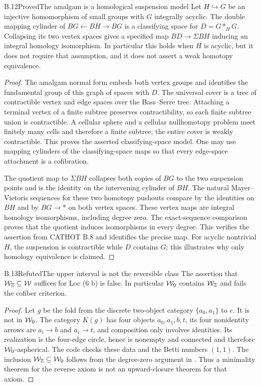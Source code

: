 \begin{claim}{B.12}{Proved}{The amalgam is a homological suspension model}
Let $H\hookrightarrow G$ be an injective homomorphism of small groups with $G$ integrally acyclic. The double mapping cylinder of $BG\leftarrow BH\to BG$ is a classifying space for $D=G*_HG$. Collapsing its two vertex spaces gives a specified map $BD\to\Sigma BH$ inducing an integral homology isomorphism. In particular this holds when $H$ is acyclic, but it does not require that assumption, and it does not assert a weak homotopy equivalence.
\end{claim}
\begin{proof}
The amalgam normal form embeds both vertex groups and identifies the fundamental group of this graph of spaces with $D$. The universal cover is a tree of contractible vertex and edge spaces over the Bass--Serre tree. Attaching a terminal vertex of a finite subtree preserves contractibility, so each finite subtree union is contractible. A cellular sphere and a cellular nullhomotopy problem meet finitely many cells and therefore a finite subtree; the entire cover is weakly contractible. This proves the asserted classifying-space model. One may use mapping cylinders of the classifying-space maps so that every edge-space attachment is a cofibration.

The quotient map to $\Sigma BH$ collapses both copies of $BG$ to the two suspension points and is the identity on the intervening cylinder of $BH$. The natural Mayer--Vietoris sequences for these two homotopy pushouts compare by the identities on $BH$ and by $BG\to *$ on both vertex spaces. These vertex maps are integral homology isomorphisms, including degree zero. The exact-sequence comparison proves that the quotient induces isomorphisms in every degree. This verifies the assertion from CATHOT B.8 and identifies the precise map. For acyclic nontrivial $H$, the suspension is contractible while $D$ contains $G$; this illustrates why only homology equivalence is claimed.
\end{proof}

\begin{claim}{B.13}{Refuted}{The upper interval is not the reversible class}
The assertion that $\mathcal{W}_{\mathbb Z}\subseteq\mathcal{W}$ suffices for Loc (6 b) is false. In particular $\mathcal{W}_0$ contains $\mathcal{W}_{\mathbb Z}$ and fails the cofiber criterion.
\end{claim}
\begin{proof}
Let $g$ be the fold from the discrete two-object category $\{a_0,a_1\}$ to $e$. It is not in $\mathcal{W}_0$. The category $K(g)$ has four objects $a_0,a_1,b,t$, its four nonidentity arrows are $a_i\to b$ and $a_i\to t$, and composition only involves identities. Its realization is the four-edge circle, hence is nonempty and connected and therefore $\mathcal{W}_0$-aspherical. The code checks these data and the Betti numbers $(1,1)$. The inclusion $\mathcal{W}_{\mathbb Z}\subseteq\mathcal{W}_0$ follows from the degree-zero argument in . Thus a minimality theorem for the reverse axiom is not an upward-closure theorem for that axiom.
\end{proof}
